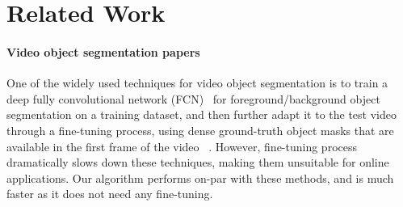 \documentclass[10pt,twocolumn,letterpaper]{article}
\begin{document}
\section{Related Work}\label{sec:relwork}\paragraph{Video object segmentation papers}
One of the widely used techniques for video object segmentation is to train a deep fully convolutional network (FCN)~\cite{fcn} for foreground/background object segmentation on a training dataset, and then further adapt it to the test video through a fine-tuning process,
using dense ground-truth object masks that are available in the first frame of the video ~\cite{OSVOS, onavos, hu2017maskrnn, Cheng_2017_ICCV, masktrack, lucid, Yoon_2017_ICCV, Ci_2018_ECCV}. 
However, fine-tuning process dramatically slows down these techniques, making them unsuitable for online applications.
Our algorithm performs on-par with these methods, and is much faster as it does not need any fine-tuning.
\end{document}
